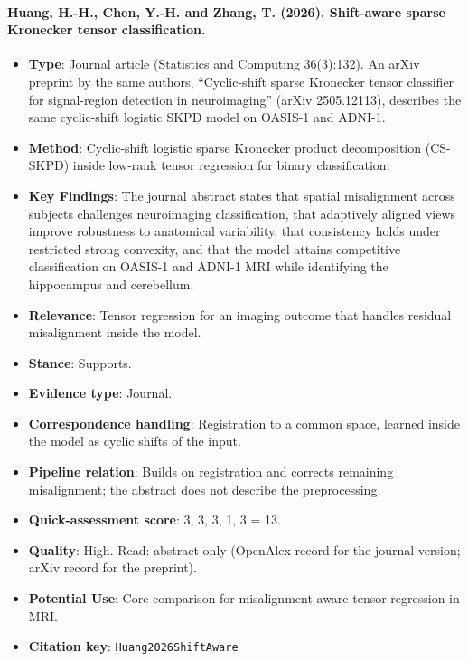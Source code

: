 \documentclass[journal,onecolumn]{IEEEtran}
\begin{document}
\paragraph{Huang, H.-H., Chen, Y.-H. and Zhang, T. (2026). Shift-aware sparse Kronecker tensor classification.~\cite{Huang2026ShiftAware}}\mbox{}

\begin{itemize}

\item{} \textbf{Type}: Journal article (Statistics and Computing 36(3):132). An arXiv preprint by the same authors, ``Cyclic-shift sparse Kronecker tensor classifier for signal-region detection in neuroimaging'' (arXiv 2505.12113), describes the same cyclic-shift logistic SKPD model on OASIS-1 and ADNI-1.

\item{} \textbf{Method}: Cyclic-shift logistic sparse Kronecker product decomposition (CS-SKPD) inside low-rank tensor regression for binary classification.

\item{} \textbf{Key Findings}: The journal abstract states that spatial misalignment across subjects challenges neuroimaging classification, that adaptively aligned views improve robustness to anatomical variability, that consistency holds under restricted strong convexity, and that the model attains competitive classification on OASIS-1 and ADNI-1 MRI while identifying the hippocampus and cerebellum.

\item{} \textbf{Relevance}: Tensor regression for an imaging outcome that handles residual misalignment inside the model.

\item{} \textbf{Stance}: Supports.

\item{} \textbf{Evidence type}: Journal.

\item{} \textbf{Correspondence handling}: Registration to a common space, learned inside the model as cyclic shifts of the input.

\item{} \textbf{Pipeline relation}: Builds on registration and corrects remaining misalignment; the abstract does not describe the preprocessing.

\item{} \textbf{Quick-assessment score}: 3, 3, 3, 1, 3 = 13.

\item{} \textbf{Quality}: High. Read: abstract only (OpenAlex record for the journal version; arXiv record for the preprint).

\item{} \textbf{Potential Use}: Core comparison for misalignment-aware tensor regression in MRI.

\item{} \textbf{Citation key}: \texttt{Huang2026ShiftAware}

\end{itemize}
\end{document}
